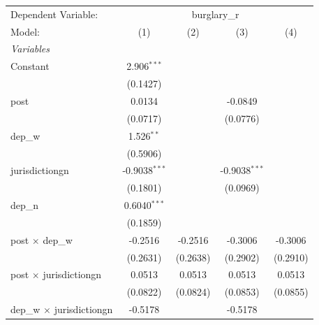 \begingroup
\centering
\begin{tabular}{lcccc}
   \tabularnewline \midrule \midrule
   Dependent Variable: & \multicolumn{4}{c}{burglary\_r}\\
   Model:                                          & (1)             & (2)      & (3)             & (4)\\  
   \midrule
   \emph{Variables}\\
   Constant                                        & 2.906$^{***}$   &          &                 &   \\   
                                                   & (0.1427)        &          &                 &   \\   
   post                                            & 0.0134          &          & -0.0849         &   \\   
                                                   & (0.0717)        &          & (0.0776)        &   \\   
   dep\_w                                          & 1.526$^{**}$    &          &                 &   \\   
                                                   & (0.5906)        &          &                 &   \\   
   jurisdictiongn                                  & -0.9038$^{***}$ &          & -0.9038$^{***}$ &   \\   
                                                   & (0.1801)        &          & (0.0969)        &   \\   
   dep\_n                                          & 0.6040$^{***}$  &          &                 &   \\   
                                                   & (0.1859)        &          &                 &   \\   
   post $\times$ dep\_w                            & -0.2516         & -0.2516  & -0.3006         & -0.3006\\   
                                                   & (0.2631)        & (0.2638) & (0.2902)        & (0.2910)\\   
   post $\times$ jurisdictiongn                    & 0.0513          & 0.0513   & 0.0513          & 0.0513\\   
                                                   & (0.0822)        & (0.0824) & (0.0853)        & (0.0855)\\   
   dep\_w $\times$ jurisdictiongn                  & -0.5178         &          & -0.5178         &   \\   

\end{tabular}
